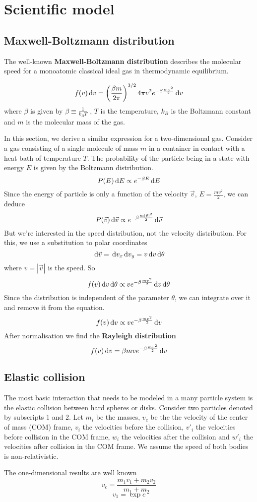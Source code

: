 \section{Scientific model}
\subsection{Maxwell-Boltzmann distribution}

The well-known \textbf{Maxwell-Boltzmann distribution} describes the molecular 
speed for a monoatomic classical ideal gas in thermodynamic equilibrium.

$$
f(v)\,\mathrm d v = \left( \frac{\beta m}{2 \pi} \right)^{3/2} 4 \pi v^2 e^{-\beta 
\frac{mv^2}{2}} \,\mathrm d v
$$
where $\beta$ is given by
\begin{math}
\beta \equiv \frac{1}{k_BT}
\end{math}
, $T$ is the temperature, $k_B$ is the Boltzmann constant and $m$ is the 
molecular mass of the gas.

In this section, we derive a similar expression for a two-dimensional gas.
Consider a gas consisting of a single molecule of mass $m$ in a container in 
contact with a heat bath of temperature $T$. The probability of the particle 
being in a state with energy $E$ is given by the Boltzmann distribution.
$$
P(E) \,\mathrm d E \propto e^{-\beta E}\,\mathrm d E
$$
Since the energy of particle is only a function of the velocity $\vec{v}$, $E = 
\frac{mv^2}{2}$, we can deduce
$$
P(\vec v)\,\mathrm d{\vec v} \propto e^{- \beta \frac{m |\vec v|^2}{2}}\,\mathrm d\vec v
$$
But we're interested in the speed distribution, not the velocity distribution.  
For this, we use a substitution to polar coordinates
$$
\,\mathrm d \vec{v} = \,\mathrm d v_x\,\mathrm d v_y = v\,\mathrm d v\,\mathrm d \theta
$$
where $v=|\vec{v}|$ is the speed. So
$$
f(v)\,\mathrm d v\,\mathrm d \theta \propto ve^{- \beta \frac{mv^2}{2}} \,\mathrm d v\,\mathrm d \theta
$$
Since the distribution is independent of the parameter $\theta$, we can 
integrate over it and remove it from the equation.
$$
f(v)\,\mathrm d v\propto ve^{- \beta \frac{mv^2}{2}} \,\mathrm d v
$$
After normalisation we find the \textbf{Rayleigh distribution}
$$
f(v)\,\mathrm d v=\beta m ve^{-\beta \frac{mv^2}{2}} \,\mathrm d v
$$

\subsection{Elastic collision}

The most basic interaction that needs to be modeled in a many particle system 
is the elastic collision between hard spheres or disks. Consider two particles 
denoted by subscripts 1 and 2. Let $m_i$ be the masses, $v_c$ be the the 
velocity of the center of mass (COM) frame, $v_i$ the velocities before the 
collision, $v'_i$ the velocities before collision in the COM frame, $w_i$ the 
velocities after the collision and $w'_i$ the velocities after collision in the 
COM frame. We assume the speed of both bodies is non-relativistic.

The one-dimensional results are well known
$$
v_c = \frac{m_1 v_1 + m_2 v_2}{m_1 + m_2}
$$
$$
v_1 = \exp{c}
$$
